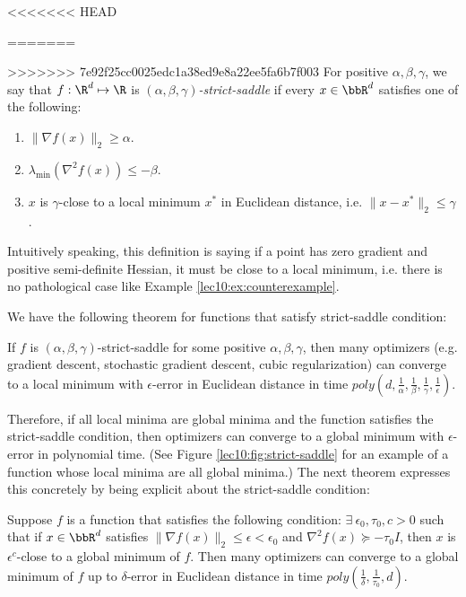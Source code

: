<<<<<<< HEAD
\begin{definition} 
=======
\begin{definition} 
>>>>>>> 7e92f25cc0025edc1a38ed9e8a22ee5fa6b7f003
For positive $\alpha, \beta, \gamma$, we say that $f: \R^d \mapsto \R$ is \textit{$(\alpha, \beta, \gamma)$-strict-saddle} if every $x \in \bbR^d$ satisfies one of the following:
\begin{enumerate}
    \item $\|\nabla f(x)\|_2 \geq \alpha$.
    \item $\lambda_{\min}(\nabla^2 f(x)) \leq -\beta$.
    \item $x$ is $\gamma$-close to a local minimum $x^*$ in Euclidean distance, i.e. $\|x - x^*\|_2 \leq \gamma$.
\end{enumerate}
\end{definition}

Intuitively speaking, this definition is saying if a point has zero gradient and positive semi-definite Hessian, it must be close to a local minimum, i.e. there is no pathological case like Example \ref{lec10:ex:counterexample}.

We have the following theorem for functions that satisfy strict-saddle condition:

\begin{theorem} 
If $f$ is $(\alpha, \beta, \gamma)$-strict-saddle for some positive $\alpha, \beta, \gamma$, then many optimizers (e.g. gradient descent, stochastic gradient descent, cubic regularization) can converge to a local minimum with $\epsilon$-error in Euclidean distance in time $poly \left(d, \frac{1}{\alpha}, \frac{1}{\beta}, \frac{1}{\gamma}, \frac{1}{\epsilon}\right)$.
\end{theorem}

Therefore, if all local minima are global minima and the function satisfies the strict-saddle condition, then optimizers can converge to a global minimum with $\epsilon$-error in polynomial time. (See Figure \ref{lec10:fig:strict-saddle} for an example of a function whose local minima are all global minima.) The next theorem expresses this concretely by being explicit about the strict-saddle condition:

\begin{theorem}
Suppose $f$ is a function that satisfies the following condition: $\exists  \ \epsilon_0, \tau_0, c > 0$ such that if $x \in \bbR^d$ satisfies $\|\nabla f(x)\|_2 \leq \epsilon < \epsilon_0$ and $\nabla^2 f(x) \succeq -\tau_0I$, then $x$ is $\epsilon^c$-close to a global minimum of $f$. Then many optimizers can converge to a global minimum of $f$ up to $\delta$-error in Euclidean distance in time $poly\left(\frac{1}{\delta}, \frac{1}{\tau_0}, d \right)$.
\end{theorem}


\end{definition}
